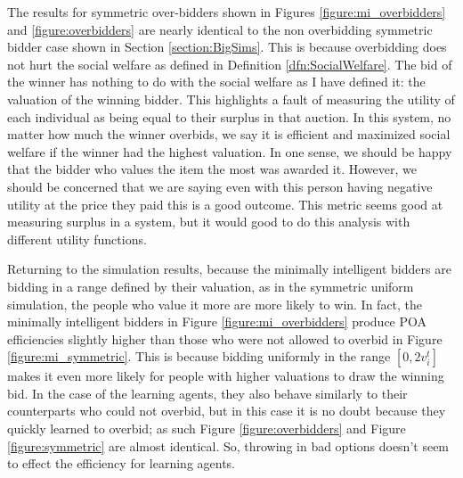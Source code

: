 \documentclass[12pt,twoside]{reedthesis}
\begin{document}
The results for symmetric over-bidders shown in Figures \ref{figure:mi_overbidders} and \ref{figure:overbidders} are nearly identical to the non overbidding symmetric bidder case shown in Section \ref{section:BigSims}. This is because overbidding does not hurt the social welfare as defined in Definition \ref{dfn:SocialWelfare}. The bid of the winner has nothing to do with the social welfare as I have defined it: the valuation of the winning bidder. This highlights a fault of measuring the utility of each individual as being equal to their surplus in that auction. In this system, no matter how much the winner overbids, we say it is efficient and maximized social welfare if the winner had the highest valuation. In one sense, we should be happy that the bidder who values the item the most was awarded it. However, we should be concerned that we are saying even with this person having negative utility at the price they paid this is a good outcome. This metric seems good at measuring surplus in a system, but it would good to do this analysis with different utility functions. 

Returning to the simulation results, because the minimally intelligent bidders are bidding in a range defined by their valuation, as in the symmetric uniform simulation, the people who value it more are more likely to win. In fact, the minimally intelligent bidders in Figure \ref{figure:mi_overbidders} produce POA efficiencies slightly higher than those who were not allowed to overbid in Figure \ref{figure:mi_symmetric}. This is because bidding uniformly in the range $[0, 2v_i^t]$ makes it even more likely for people with higher valuations to draw the winning bid. In the case of the learning agents, they also behave similarly to their counterparts who could not overbid, but in this case it is no doubt because they quickly learned to overbid; as such Figure \ref{figure:overbidders} and Figure \ref{figure:symmetric} are almost identical. So, throwing in bad options doesn't seem to effect the efficiency for learning agents.
\end{document}
